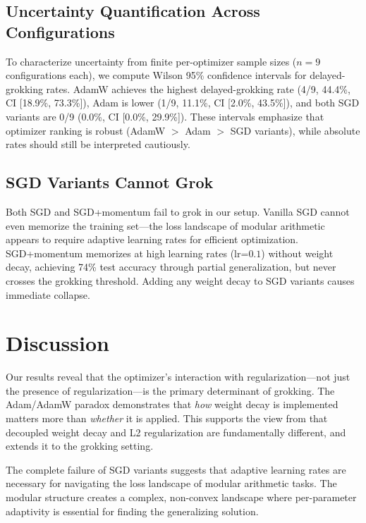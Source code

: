 \documentclass[11pt,a4paper]{article}
\begin{document}
\subsection{Uncertainty Quantification Across Configurations}

To characterize uncertainty from finite per-optimizer sample sizes ($n=9$ configurations each), we compute Wilson 95\% confidence intervals for delayed-grokking rates. AdamW achieves the highest delayed-grokking rate (4/9, 44.4\%, CI [18.9\%, 73.3\%]), Adam is lower (1/9, 11.1\%, CI [2.0\%, 43.5\%]), and both SGD variants are 0/9 (0.0\%, CI [0.0\%, 29.9\%]). These intervals emphasize that optimizer ranking is robust (AdamW $>$ Adam $>$ SGD variants), while absolute rates should still be interpreted cautiously.

\subsection{SGD Variants Cannot Grok}

Both SGD and SGD+momentum fail to grok in our setup. Vanilla SGD cannot even memorize the training set---the loss landscape of modular arithmetic appears to require adaptive learning rates for efficient optimization. SGD+momentum memorizes at high learning rates (lr=$0.1$) without weight decay, achieving 74\% test accuracy through partial generalization, but never crosses the grokking threshold. Adding any weight decay to SGD variants causes immediate collapse.

\section{Discussion}

Our results reveal that the optimizer's interaction with regularization---not just the presence of regularization---is the primary determinant of grokking. The Adam/AdamW paradox demonstrates that \emph{how} weight decay is implemented matters more than \emph{whether} it is applied. This supports the view from \citet{loshchilov2019decoupled} that decoupled weight decay and L2 regularization are fundamentally different, and extends it to the grokking setting.

The complete failure of SGD variants suggests that adaptive learning rates are necessary for navigating the loss landscape of modular arithmetic tasks. The modular structure creates a complex, non-convex landscape where per-parameter adaptivity is essential for finding the generalizing solution.
\end{document}
